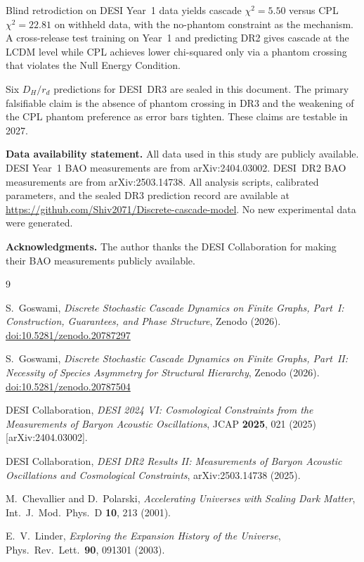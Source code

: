 \documentclass[12pt,a4paper]{article}
\theoremstyle{plain}
\theoremstyle{definition}
\begin{document}
Blind retrodiction on DESI Year~1 data yields cascade $\chi^2 = 5.50$ versus CPL
$\chi^2 = 22.81$ on withheld data, with the no-phantom constraint as the mechanism.
A cross-release test training on Year~1 and predicting DR2 gives cascade at the
LCDM level while CPL achieves lower chi-squared only via a phantom crossing that
violates the Null Energy Condition.

Six $D_H/r_d$ predictions for DESI~DR3 are sealed in this document. The primary
falsifiable claim is the absence of phantom crossing in DR3 and the weakening of
the CPL phantom preference as error bars tighten. These claims are testable in 2027.

\bigskip
\noindent\textbf{Data availability statement.}
All data used in this study are publicly available.
DESI Year~1 BAO measurements are from arXiv:2404.03002.
DESI~DR2 BAO measurements are from arXiv:2503.14738.
All analysis scripts, calibrated parameters, and the sealed DR3 prediction
record are available at \url{https://github.com/Shiv2071/Discrete-cascade-model}.
No new experimental data were generated.

\bigskip
\noindent\textbf{Acknowledgments.} The author thanks the DESI Collaboration for making their BAO measurements publicly available.

\begin{thebibliography}{9}

S.~Goswami,
\textit{Discrete Stochastic Cascade Dynamics on Finite Graphs,
Part~I: Construction, Guarantees, and Phase Structure},
Zenodo (2026).
\href{https://doi.org/10.5281/zenodo.20787297}{doi:10.5281/zenodo.20787297}

S.~Goswami,
\textit{Discrete Stochastic Cascade Dynamics on Finite Graphs,
Part~II: Necessity of Species Asymmetry for Structural Hierarchy},
Zenodo (2026).
\href{https://doi.org/10.5281/zenodo.20787504}{doi:10.5281/zenodo.20787504}

DESI Collaboration,
\textit{DESI 2024 VI: Cosmological Constraints from the Measurements
of Baryon Acoustic Oscillations},
JCAP \textbf{2025}, 021 (2025) [arXiv:2404.03002].

DESI Collaboration,
\textit{DESI DR2 Results II: Measurements of Baryon Acoustic Oscillations
and Cosmological Constraints},
arXiv:2503.14738 (2025).

M.~Chevallier and D.~Polarski,
\textit{Accelerating Universes with Scaling Dark Matter},
Int.\ J.\ Mod.\ Phys.\ D \textbf{10}, 213 (2001).

E.~V.~Linder,
\textit{Exploring the Expansion History of the Universe},
Phys.\ Rev.\ Lett.\ \textbf{90}, 091301 (2003).

\end{thebibliography}
\end{document}
